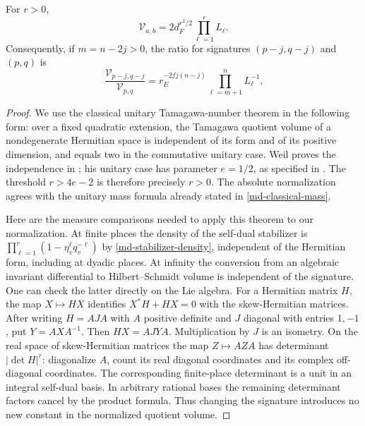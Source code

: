 \begin{lemma}\label{rv-unitary-volume}
For $r>0$,
\begin{equation}\label{rv-unitary-volume-formula}
        \mathcal V_{a,b}
          =2d_F^{r^2/2}\prod_{\ell=1}^{r}L_\ell .
\end{equation}
Consequently, if $m=n-2j>0$, the ratio for signatures
$(p-j,q-j)$ and $(p,q)$ is
\begin{equation}\label{rv-volume-ratio}
 \frac{\mathcal V_{p-j,q-j}}{\mathcal V_{p,q}}
       =r_E^{-2fj(n-j)}
                      \prod_{\ell=m+1}^{n}L_\ell^{-1}.
\end{equation}
\end{lemma}
\begin{proof}
We use the classical unitary Tamagawa-number theorem in the
following form: over a fixed quadratic extension, the
Tamagawa quotient volume of a nondegenerate Hermitian
space is independent of its form and of its positive
dimension, and equals two in the commutative unitary case.
Weil proves the independence in \cite[\S54]{weil-siegel};
his unitary case has parameter $e=1/2$, as specified in
\cite[\S27]{weil-siegel}.  The threshold $r>4e-2$ is
therefore precisely $r>0$.  The absolute normalization
agrees with the unitary mass formula already stated in
\eqref{md-classical-mass}.

Here are the measure comparisons needed to apply this
theorem to our normalization.  At finite places the density
of the self-dual stabilizer is
$\prod_{\ell=1}^{r}(1-\eta_v^\ell q_v^{-\ell})$ by
\eqref{md-stabilizer-density}, independent of the Hermitian
form, including at dyadic places.  At infinity the conversion
from an algebraic invariant differential to
Hilbert--Schmidt volume is independent of the signature.
One can check the latter directly on the Lie algebra.
For a Hermitian matrix $H$, the map $X\mapsto HX$
identifies $X^*H+HX=0$ with the skew-Hermitian matrices.
After writing $H=AJA$ with $A$ positive definite and $J$
diagonal with entries $1,-1$, put $Y=AXA^{-1}$.
Then $HX=AJYA$.  Multiplication by $J$ is an isometry.
On the real space of skew-Hermitian matrices the map
$Z\mapsto AZA$ has determinant $|\det H|^r$:
diagonalize $A$, count its real diagonal coordinates and
its complex off-diagonal coordinates.  The corresponding
finite-place determinant is a unit in an integral
self-dual basis.  In arbitrary rational bases the
remaining determinant factors cancel by the product
formula.  Thus changing the signature introduces no
new constant in the normalized quotient volume.


\end{proof}
